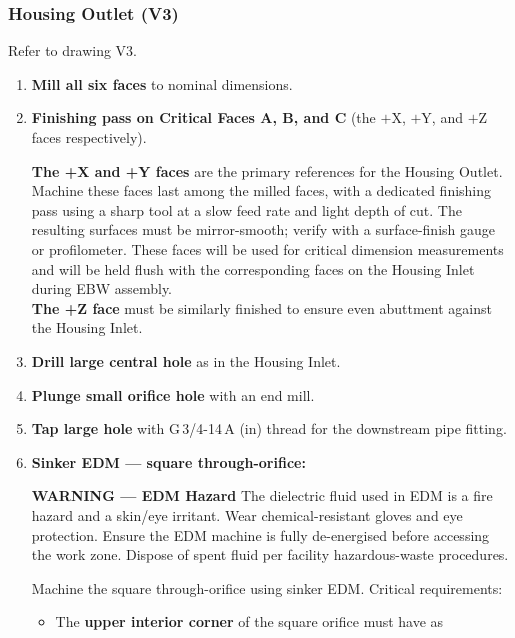 \documentclass[12pt, letterpaper]{report}%
\newcounter{mycounter}           %
\newcounter{sub}[mycounter]      %
\begin{document}
\subsubsection{Housing Outlet (V3)}
\label{sec:mfg:V3}

Refer to drawing V3.

\begin{enumerate}[itemsep=4pt]
	\item \textbf{Mill all six faces} to nominal dimensions.
	\item \textbf{Finishing pass on Critical Faces A, B, and C}
				(the $+$X, $+$Y, and $+$Z faces respectively).
				\begin{notebox}
				\textbf{The +X and +Y faces} are the primary references for the Housing Outlet.
				Machine these faces last among the milled faces, with a dedicated finishing pass
				using a sharp tool at a slow feed rate and light depth of cut.
				The resulting surfaces must be mirror-smooth; verify with a surface-finish
				gauge or profilometer. These faces will be used for critical dimension measurements
				and will be held flush with the corresponding faces on the Housing Inlet
				during EBW assembly. \\
				\textbf{The +Z face} must be similarly finished to ensure even abuttment against the Housing Inlet.
				\end{notebox}
	\item \textbf{Drill large central hole} as in the Housing Inlet.
	\item \textbf{Plunge small orifice hole} with an end mill.
	\item \textbf{Tap large hole} with G\,3/4-14\,A (in) thread for the downstream
				pipe fitting.
	\item \textbf{Sinker EDM --- square through-orifice:}
				\begin{warningbox}
				\textbf{\textcolor{warnred}{WARNING --- EDM Hazard}}
				The dielectric fluid used in EDM is a fire hazard and a skin/eye irritant.
				Wear chemical-resistant gloves and eye protection. Ensure the EDM machine is
				fully de-energised before accessing the work zone. Dispose of spent fluid per
				facility hazardous-waste procedures.
				\end{warningbox}
				Machine the square through-orifice using sinker EDM.
				Critical requirements:
				\begin{itemize}[itemsep=2pt]
					\item The \textbf{upper interior corner} of the square orifice must have as

\end{itemize}
\end{enumerate}
\end{document}
